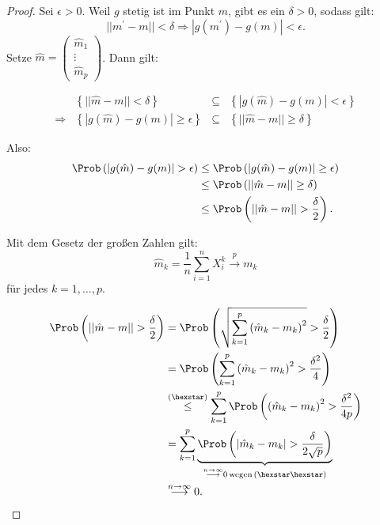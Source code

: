 \documentclass{tstextbook}
\begin{document}
\begin{proof}
	Sei $ \epsilon > 0 $. Weil $ g $ stetig ist im Punkt $ m $, gibt es ein $ \delta > 0 $, sodass gilt: 
	\[ ||m^\prime - m|| < \delta \Rightarrow |g(m^\prime) - g(m)| < \epsilon. \]
	Setze $ \hat{m} = \begin{pmatrix}
		\hat{m}_1 \\ \vdots \\ \hat{m}_p
	\end{pmatrix} $. Dann gilt:

	\[
	\begin{aligned}
		\; & \left\lbrace||\hat{m} - m|| < \delta \right\rbrace & \subseteq & \left\lbrace|g(\hat{m}) - g(m)| < \epsilon \right\rbrace \\
		\Rightarrow	& \left\lbrace|g(\hat{m}) - g(m)| \ge \epsilon \right\rbrace & \subseteq & \left\lbrace||\hat{m} - m|| \ge \delta \right\rbrace
	\end{aligned}
	\]
	
	Also: 
	\[
	\begin{aligned}
		\Prob\left(|g(\hat{m})-g(m)|>\epsilon \right) & \le \Prob\left(|g(\hat{m})-g(m)|\ge\epsilon \right) \\
		& \le \Prob\left(||\hat{m}-m||\ge \delta \right) \\
		& \le \Prob\left(||\hat{m}-m||> \frac{\delta}{2} \right).
	\end{aligned}
	\]
	
	Mit dem Gesetz der großen Zahlen gilt: 
	\[
	\hat{m}_k = \frac{1}{n} \sum_{i=1}^{n} X_i^k \overset{p}{\longrightarrow} m_k \tag{$\hexstar\hexstar$}
	\]
	für jedes $ k=1,\ldots, p $. 
	
	\[
	\begin{aligned}
		\Prob\left(||\hat{m}-m||> \frac{\delta}{2} \right) & = \Prob\left(\sqrt{\sum_{k=1}^{p}\left(\hat{m}_k-m_k\right)^2} > \frac{\delta}{2} \right) \\
		& = \Prob\left(\sum_{k=1}^{p}\left(\hat{m}_k-m_k\right)^2 > \frac{\delta^2}{4} \right) \\
		& \overset{(\hexstar)}{\le} \sum_{k=1}^{p} \Prob\left(\left(\hat{m}_k-m_k\right)^2 > \frac{\delta^2}{4p} \right) \\
		& = \sum_{k=1}^{p} \underbrace{\Prob\left(\left|\hat{m}_k-m_k\right| > \frac{\delta}{2\sqrt{p}} \right)}_{\overset{n\to\infty}{\longrightarrow} 0 \, \text{wegen} \, (\hexstar\hexstar)} \\
		& \overset{n\to \infty}{\longrightarrow} 0. 		
	\end{aligned}
	\]
\end{proof}
\end{document}

